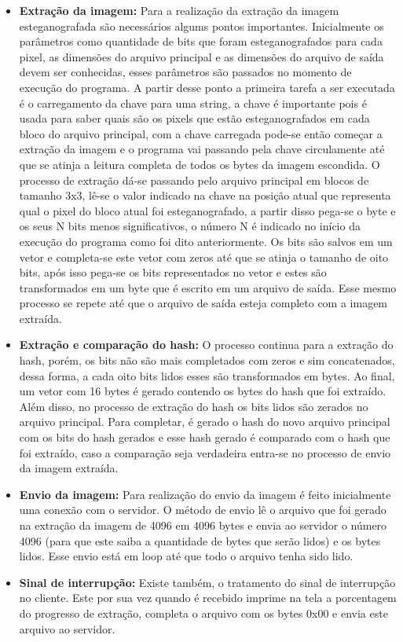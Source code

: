 \documentclass[journal,transmag]{IEEEtran}
\begin{document}
\begin{itemize}
	\begin{itemize}
		\item \textbf{Extração da imagem:} Para a realização da extração da imagem esteganografada são necessários algums pontos importantes. Inicialmente os parâmetros como quantidade de bits que foram esteganografados para cada pixel, as dimensões do arquivo principal e as dimensões do arquivo de saída devem ser conhecidas, esses parâmetros são passados no momento de execução do programa. A partir desse ponto a primeira tarefa a ser executada é o carregamento da chave para uma string, a chave é importante pois é usada para saber quais são os pixels que estão esteganografados em cada bloco do arquivo principal, com a chave carregada pode-se então começar a extração da imagem e o programa vai passando pela chave circulamente até que se atinja a leitura completa de todos os bytes da imagem escondida.
		O processo de extração dá-se passando pelo arquivo principal em blocos de tamanho 3x3, lê-se o valor indicado na chave na posição atual que representa qual o pixel do bloco atual foi esteganografado, a partir disso pega-se o byte e os seus N bits menos significativos, o número N é indicado no início da execução do programa como foi dito anteriormente. Os bits são salvos em um vetor e completa-se este vetor com zeros até que se atinja o tamanho de oito bits, após isso pega-se os bits representados no vetor e estes são transformados em um byte que é escrito em um arquivo de saída. Esse mesmo processo se repete até que o arquivo de saída esteja completo com a imagem extraída.
		\item \textbf{Extração e comparação do hash:} O processo continua para a extração do hash, porém, os bits não são mais completados com zeros e sim concatenados, dessa forma, a cada oito bits lidos esses são transformados em bytes. Ao final, um vetor com 16 bytes é gerado contendo os bytes do hash que foi extraído. Além disso, no processo de extração do hash os bits lidos são zerados no arquivo principal. Para completar, é gerado o hash do novo arquivo principal com os bits do hash gerados e esse hash gerado é comparado com o hash que foi extraído, caso a comparação seja verdadeira entra-se no processo de envio da imagem extraída.
		\item \textbf{Envio da imagem:} Para realização do envio da imagem é feito inicialmente uma conexão com o servidor. O método de envio lê o arquivo que foi gerado na extração da imagem de 4096 em 4096 bytes e envia ao servidor o número 4096 (para que este saiba a quantidade de bytes que serão lidos) e os bytes lidos. Esse envio está em loop até que todo o arquivo tenha sido lido.
		\item \textbf{Sinal de interrupção:} Existe também, o tratamento do sinal de interrupção no cliente. Este por sua vez quando é recebido imprime na tela a porcentagem do progresso de extração, completa o arquivo com os bytes 0x00 e envia este arquivo ao servidor.
	\end{itemize}
\end{itemize}
\end{document}
